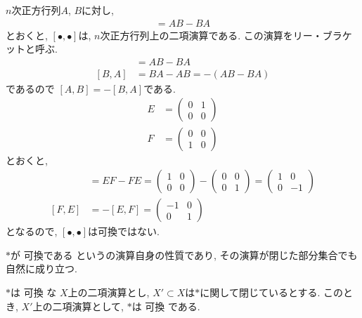 \begin{nonexample}
  $n$次正方行列$A$, $B$に対し,
  \begin{align*}
    [A,B]=AB-BA
  \end{align*}
  とおくと,
  $[\bullet,\bullet]$は,
  $n$次正方行列上の二項演算である.
  この演算をリー・ブラケットと呼ぶ.
  \begin{align*}
    [A,B]&=AB-BA\\
    [B,A]&=BA-AB=-(AB-BA)
  \end{align*}
  であるので
  $[A,B]=-[B,A]$である.
  \begin{align*}
    E&=\begin{pmatrix}0&1\\0&0\end{pmatrix}\\
    F&=\begin{pmatrix}0&0\\1&0\end{pmatrix}
  \end{align*}
  とおくと,
  \begin{align*}
    [E,F]&=EF-FE=
    \begin{pmatrix}
      1&0\\0&0
    \end{pmatrix}
    -
    \begin{pmatrix}
      0&0\\0&1
    \end{pmatrix}
    =
    \begin{pmatrix}
      1&0\\0&-1
    \end{pmatrix}\\
    [F,E]&=-[E,F]=
    \begin{pmatrix}
      -1&0\\0&1
    \end{pmatrix}
  \end{align*}
  となるので, $[\bullet,\bullet]$は可換ではない.
\end{nonexample}

$\ast$が
可換である
というの演算自身の性質であり,
その演算が閉じた部分集合でも自然に成り立つ.
\begin{prop}
  $\ast$は
  可換
  な
  $X$上の二項演算とし,
  $X'\subset X$は$\ast$に関して閉じているとする.
  このとき,
  $X'$上の二項演算として,
  $\ast$は
  可換
  である.
\end{prop}

